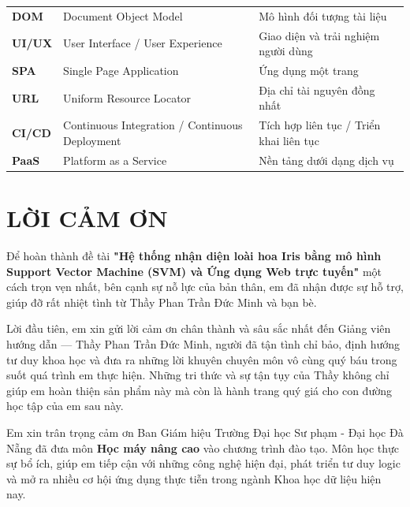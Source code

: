 \documentclass{article}
\begin{document}
\begin{table}[H]
\begin{tabular}{p{2cm} p{6.5cm} p{6.5cm}}
			\textbf{DOM} 
			& Document Object Model 
			& Mô hình đối tượng tài liệu \\
			
			\textbf{UI/UX} 
			& User Interface / User Experience 
			& Giao diện và trải nghiệm người dùng \\
			
			\textbf{SPA} 
			& Single Page Application 
			& Ứng dụng một trang \\
			
			\textbf{URL} 
			& Uniform Resource Locator 
			& Địa chỉ tài nguyên đồng nhất \\
			
			\textbf{CI/CD} 
			& Continuous Integration / Continuous Deployment 
			& Tích hợp liên tục / Triển khai liên tục \\
			
			\textbf{PaaS} 
			& Platform as a Service 
			& Nền tảng dưới dạng dịch vụ \\
			
			
			\bottomrule
		\end{tabular}
	\end{table}
	
	\newpage
	
	\section{\centering LỜI CẢM ƠN}
	
	\hspace{0.5cm}
	Để hoàn thành đề tài \textbf{"Hệ thống nhận diện loài hoa Iris bằng mô hình Support Vector Machine (SVM) và Ứng dụng Web trực tuyến"} một cách trọn vẹn nhất, bên cạnh sự nỗ lực của bản thân, em đã nhận được sự hỗ trợ, giúp đỡ rất nhiệt tình từ Thầy Phan Trần Đức Minh và bạn bè.
	
	Lời đầu tiên, em xin gửi lời cảm ơn chân thành và sâu sắc nhất đến Giảng viên hướng dẫn — Thầy Phan Trần Đức Minh, người đã tận tình chỉ bảo, định hướng tư duy khoa học và đưa ra những lời khuyên chuyên môn vô cùng quý báu trong suốt quá trình em thực hiện. Những tri thức và sự tận tụy của Thầy không chỉ giúp em hoàn thiện sản phẩm này mà còn là hành trang quý giá cho con đường học tập của em sau này.
	
	Em xin trân trọng cảm ơn Ban Giám hiệu Trường Đại học Sư phạm - Đại học Đà Nẵng đã đưa môn \textbf{Học máy nâng cao} vào chương trình đào tạo. Môn học thực sự bổ ích, giúp em tiếp cận với những công nghệ hiện đại, phát triển tư duy logic và mở ra nhiều cơ hội ứng dụng thực tiễn trong ngành Khoa học dữ liệu hiện nay.
	
\end{document}
